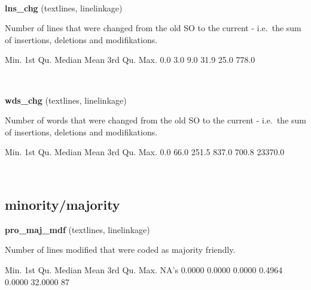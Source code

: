 \documentclass[]{article}
\newenvironment{Shaded}{\begin{snugshade}}{\end{snugshade}}
\newcommand{\FloatTok}[1]{\textcolor[rgb]{0.00,0.00,0.81}{{#1}}}
\newcommand{\StringTok}[1]{\textcolor[rgb]{0.31,0.60,0.02}{{#1}}}
\newcommand{\NormalTok}[1]{{#1}}
\begin{document}
~

\vspace{1em}

\textbf{lns\_chg} (textlines, linelinkage)

Number of lines that were changed from the old SO to the current -
i.e.~the sum of insertions, deletions and modifikations.

\begin{Shaded}
\begin{Highlighting}[]
   \NormalTok{Min. 1st Qu.  Median    Mean 3rd Qu.    Max. }
    \FloatTok{0.0}     \FloatTok{3.0}     \FloatTok{9.0}    \FloatTok{31.9}    \FloatTok{25.0}   \FloatTok{778.0} 
\end{Highlighting}
\end{Shaded}

~

\vspace{1em}

\textbf{wds\_chg} (textlines, linelinkage)

Number of words that were changed from the old SO to the current -
i.e.~the sum of insertions, deletions and modifikations.

\begin{Shaded}
\begin{Highlighting}[]
   \NormalTok{Min. 1st Qu.  Median    Mean 3rd Qu.    Max. }
    \FloatTok{0.0}    \FloatTok{66.0}   \FloatTok{251.5}   \FloatTok{837.0}   \FloatTok{700.8} \FloatTok{23370.0} 
\end{Highlighting}
\end{Shaded}

~

\vspace{1em}

\subsection{minority/majority}\label{minoritymajority}

\textbf{pro\_maj\_mdf} (textlines, linelinkage)

Number of lines modified that were coded as majority friendly.

\begin{Shaded}
\begin{Highlighting}[]
   \NormalTok{Min. 1st Qu.  Median    Mean 3rd Qu.    Max.    NA}\StringTok{'s }
\StringTok{ 0.0000  0.0000  0.0000  0.4964  0.0000 32.0000      87 }
\end{Highlighting}
\end{Shaded}
\end{document}
